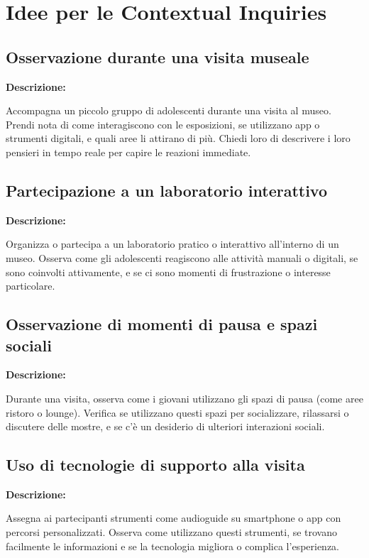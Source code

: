 \documentclass{article}
\begin{document}
\section{Idee per le Contextual Inquiries}

\subsection{Osservazione durante una visita museale}

\textbf{Descrizione:}

Accompagna un piccolo gruppo di adolescenti durante una visita al museo. Prendi nota di come interagiscono con le esposizioni, se utilizzano app o strumenti digitali, e quali aree li attirano di più. Chiedi loro di descrivere i loro pensieri in tempo reale per capire le reazioni immediate.

\subsection{Partecipazione a un laboratorio interattivo}

\textbf{Descrizione:}

Organizza o partecipa a un laboratorio pratico o interattivo all’interno di un museo. Osserva come gli adolescenti reagiscono alle attività manuali o digitali, se sono coinvolti attivamente, e se ci sono momenti di frustrazione o interesse particolare.

\subsection{Osservazione di momenti di pausa e spazi sociali}

\textbf{Descrizione:}

Durante una visita, osserva come i giovani utilizzano gli spazi di pausa (come aree ristoro o lounge). Verifica se utilizzano questi spazi per socializzare, rilassarsi o discutere delle mostre, e se c’è un desiderio di ulteriori interazioni sociali.

\subsection{Uso di tecnologie di supporto alla visita}

\textbf{Descrizione:}

Assegna ai partecipanti strumenti come audioguide su smartphone o app con percorsi personalizzati. Osserva come utilizzano questi strumenti, se trovano facilmente le informazioni e se la tecnologia migliora o complica l’esperienza.
\end{document}
